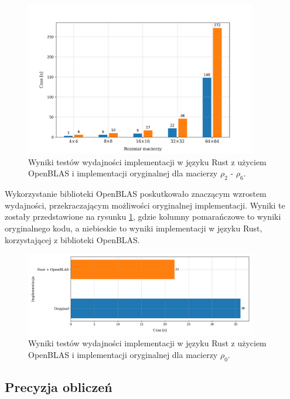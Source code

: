 \documentclass[10pt, a4paper]{article}
\begin{document}
\begin{sloppypar}
    \FloatBarrier
    \begin{figure}[ht]
      \centering
      \includegraphics[width=0.9\textwidth]{"resources/benchmark_6/plot.png"}
      \caption{Wyniki testów wydajności implementacji w języku Rust z użyciem OpenBLAS i implementacji oryginalnej dla macierzy $\rho
      _{2}$ - $\rho_{6}$.}
      \label{fifth-perf}
    \end{figure}
    \FloatBarrier

    Wykorzystanie biblioteki OpenBLAS poskutkowało znaczącym wzrostem wydajności,
    przekraczającym możliwości oryginalnej implementacji. Wyniki te zostały przedstawione
    na rysunku \ref{fifth-perf}, gdzie kolumny pomarańczowe to wyniki oryginalnego kodu,
    a niebieskie to wyniki implementacji w języku Rust, korzystającej z biblioteki
    OpenBLAS.

    \FloatBarrier
    \begin{figure}[ht]
      \centering
      \includegraphics[width=0.9\textwidth]{"resources/benchmark_6/plot2.png"}
      \caption{Wyniki testów wydajności implementacji w języku Rust z użyciem OpenBLAS i implementacji oryginalnej dla macierzy $\rho
      _{0}$.}
      \label{fifth-alt-perf}
    \end{figure}
    \FloatBarrier

    \subsection{Precyzja obliczeń}



\end{sloppypar}
\end{document}

